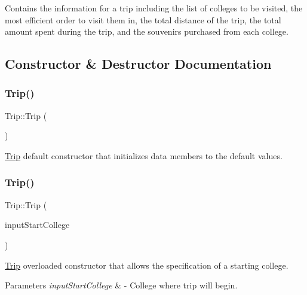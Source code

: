 Contains the information for a trip including the list of colleges to be visited, the most efficient order to visit them in, the total distance of the trip, the total amount spent during the trip, and the souvenirs purchased from each college. 

\subsection{Constructor \& Destructor Documentation}
\mbox{\label{class_trip_aa67b77d0d2de622ed5eb9e9cad34db8f}} 
\subsubsection{\texorpdfstring{Trip()}{Trip()}\hspace{0.1cm}{\footnotesize\ttfamily [1/2]}}
{\footnotesize\ttfamily Trip\+::\+Trip (\begin{DoxyParamCaption}{ }\end{DoxyParamCaption})}



\hyperlink{class_trip}{Trip} default constructor that initializes data members to the default values. 

\mbox{\label{class_trip_a1151ea3cd9f01ba725095b1efaf2bfba}} 
\subsubsection{\texorpdfstring{Trip()}{Trip()}\hspace{0.1cm}{\footnotesize\ttfamily [2/2]}}
{\footnotesize\ttfamily Trip\+::\+Trip (\begin{DoxyParamCaption}\item[{Q\+String}]{input\+Start\+College }\end{DoxyParamCaption})}



\hyperlink{class_trip}{Trip} overloaded constructor that allows the specification of a starting college. 


\begin{DoxyParams}{Parameters}
{\em input\+Start\+College} & -\/ College where trip will begin. \\
\hline
\end{DoxyParams}


